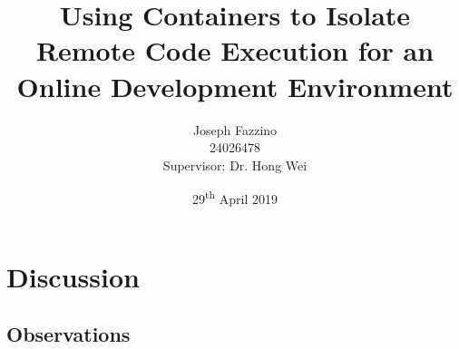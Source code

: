 \documentclass[12pt, a4paper]{extreport}
\title{Using Containers to Isolate Remote Code Execution for an Online Development Environment}
\author{
    Joseph Fazzino\\
    24026478\\
    [4cm]{Supervisor: Dr. Hong Wei}
}
\date{29\textsuperscript{th} April 2019}
\begin{document}
\maketitle
\setcounter{tocdepth}{1}
\tableofcontents
\pagebreak



\pagebreak



\pagebreak

















\chapter{Discussion}


\section{Observations}
\end{document}
